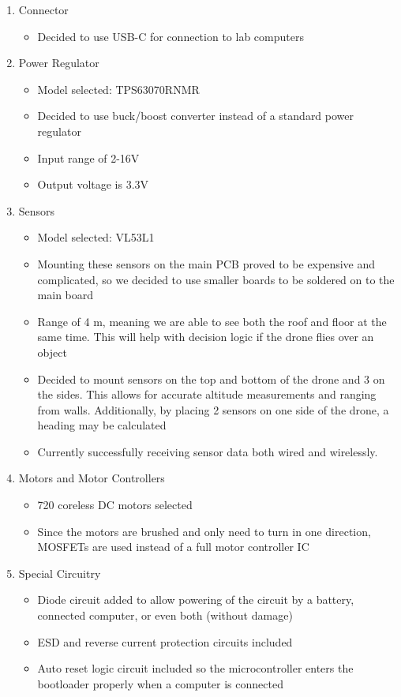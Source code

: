 \documentclass[12pt, titlepage]{article}
\begin{document}
\begin{enumerate}
\item Connector
\begin{itemize}
\item Decided to use USB-C for connection to lab computers
\end{itemize}

\item Power Regulator
\begin{itemize}
\item Model selected: TPS63070RNMR
\item Decided to use buck/boost converter instead of a standard power regulator
\item Input range of 2-16V
\item Output voltage is 3.3V
\end{itemize}

\item Sensors
\begin{itemize}
\item Model selected: VL53L1
\item Mounting these sensors on the main PCB proved to be expensive and complicated, so we decided to use smaller boards to be soldered on to the main board
\item Range of 4 m, meaning we are able to see both the roof and floor at the same time. This will help with decision logic if the drone flies over an object
\item Decided to mount sensors on the top and bottom of the drone and 3 on the sides. This allows for accurate altitude measurements and ranging from walls. Additionally, by placing 2 sensors on one side of the drone, a heading may be calculated
\item Currently successfully receiving sensor data both wired and wirelessly.
\end{itemize}

\item Motors and Motor Controllers
\begin{itemize}
\item 720 coreless DC motors selected
\item Since the motors are brushed and only need to turn in one direction, MOSFETs are used instead of a full motor controller IC
\end{itemize}

\item Special Circuitry
\begin{itemize}
\item Diode circuit added to allow powering of the circuit by a battery, connected computer, or even both (without damage)
\item ESD and reverse current protection circuits included
\item Auto reset logic circuit included so the microcontroller enters the bootloader properly when a computer is connected
\end{itemize}


\end{enumerate}
\end{document}
